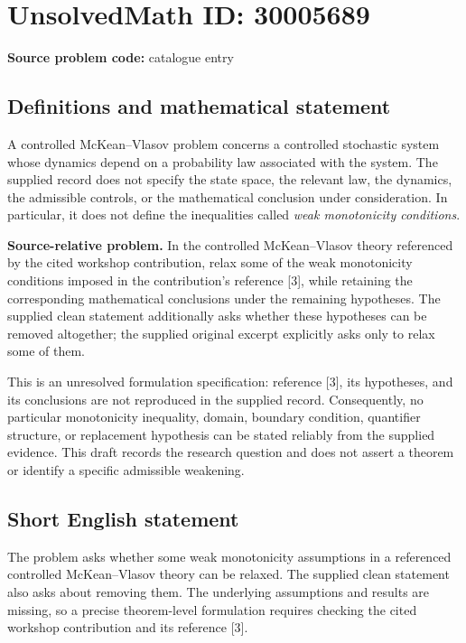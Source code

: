 \documentclass[11pt]{article}
\begin{document}
\section*{UnsolvedMath ID: 30005689}
\textbf{Source problem code:} catalogue entry
\subsection{Definitions and mathematical statement}
A controlled McKean--Vlasov problem concerns a controlled stochastic system whose dynamics depend on a probability law associated with the system. The supplied record does not specify the state space, the relevant law, the dynamics, the admissible controls, or the mathematical conclusion under consideration. In particular, it does not define the inequalities called \emph{weak monotonicity conditions}.

\textbf{Source-relative problem.} In the controlled McKean--Vlasov theory referenced by the cited workshop contribution, relax some of the weak monotonicity conditions imposed in the contribution's reference [3], while retaining the corresponding mathematical conclusions under the remaining hypotheses. The supplied clean statement additionally asks whether these hypotheses can be removed altogether; the supplied original excerpt explicitly asks only to relax some of them.

This is an unresolved formulation specification: reference [3], its hypotheses, and its conclusions are not reproduced in the supplied record. Consequently, no particular monotonicity inequality, domain, boundary condition, quantifier structure, or replacement hypothesis can be stated reliably from the supplied evidence. This draft records the research question and does not assert a theorem or identify a specific admissible weakening.
\subsection{Short English statement}
The problem asks whether some weak monotonicity assumptions in a referenced controlled McKean--Vlasov theory can be relaxed. The supplied clean statement also asks about removing them. The underlying assumptions and results are missing, so a precise theorem-level formulation requires checking the cited workshop contribution and its reference [3].
\end{document}
